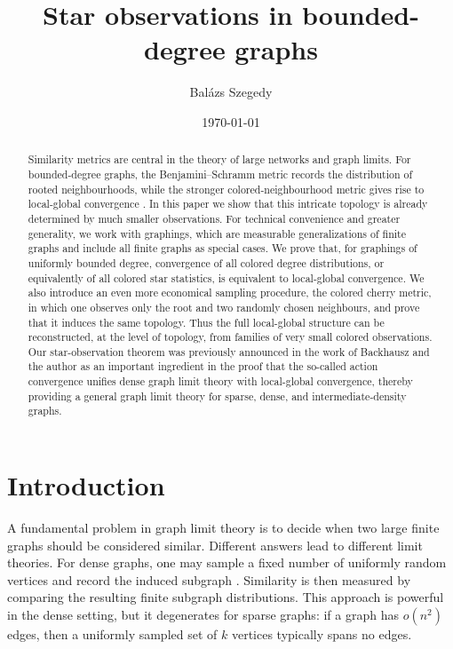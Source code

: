 \documentclass[11pt]{amsart}
\title[Star observations in bounded-degree graphs]{Star observations in bounded-degree graphs}
\author{Bal\'azs Szegedy}
\date{\today}
\theoremstyle{remark}
\begin{document}
\begin{abstract}
Similarity metrics are central in the theory of large networks and graph limits. For bounded-degree graphs, the Benjamini--Schramm metric records the distribution of rooted neighbourhoods, while the stronger colored-neighbourhood metric \cite{BR} gives rise to local-global convergence \cite{HLSz}. In this paper we show that this intricate topology is already determined by much smaller observations. For technical convenience and greater generality, we work with graphings, which are measurable generalizations of finite graphs and include all finite graphs as special cases. We prove that, for graphings of uniformly bounded degree, convergence of all colored degree distributions, or equivalently of all colored star statistics, is equivalent to local-global convergence. We also introduce an even more economical sampling procedure, the colored cherry metric, in which one observes only the root and two randomly chosen neighbours, and prove that it induces the same topology. Thus the full local-global structure can be reconstructed, at the level of topology, from families of very small colored observations. Our star-observation theorem was previously announced in the work of Backhausz and the author \cite{BSzAction} as an important ingredient in the proof that the so-called action convergence unifies dense graph limit theory with local-global convergence, thereby providing a general graph limit theory for sparse, dense, and intermediate-density graphs.
\end{abstract}



\maketitle

\section{Introduction}

A fundamental problem in graph limit theory \cite{L} is to decide when two large finite graphs should be considered similar.  Different answers lead to different limit theories.  For dense graphs, one may sample a fixed number of uniformly random vertices and record the induced subgraph \cite{LovaszSzegedyDense}. Similarity is then measured by comparing the resulting finite subgraph distributions.  This approach is powerful in the dense setting, but it degenerates for sparse graphs: if a graph has $o(n^2)$ edges, then a uniformly sampled set of $k$ vertices typically spans no edges.
\end{document}
